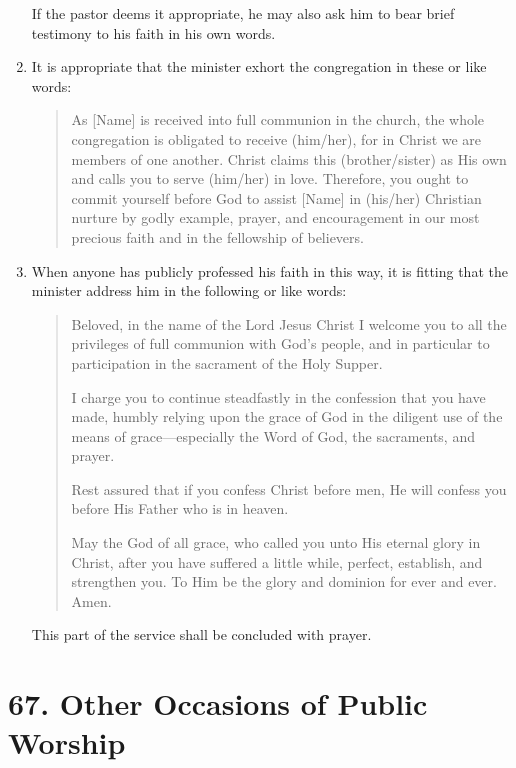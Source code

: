 \documentclass[
]{book}
\begin{document}
\begin{enumerate}
  If the pastor deems it appropriate, he may also ask him to bear brief testimony to his faith in his own words.
\item
  \protect\hypertarget{66.3}{\href{}{}}It is appropriate that the minister exhort the congregation in these or like words:

  \begin{quote}
  As {[}Name{]} is received into full communion in the church, the whole congregation is obligated to receive (him/her), for in Christ we are members of one another. Christ claims this (brother/sister) as His own and calls you to serve (him/her) in love. Therefore, you ought to commit yourself before God to assist {[}Name{]} in (his/her) Christian nurture by godly example, prayer, and encouragement in our most precious faith and in the fellowship of believers.
  \end{quote}
\item
  \protect\hypertarget{66.4}{\href{}{}}When anyone has publicly professed his faith in this way, it is fitting that the minister address him in the following or like words:

  \begin{quote}
  Beloved, in the name of the Lord Jesus Christ I welcome you to all the privileges of full communion with God's people, and in particular to participation in the sacrament of the Holy Supper.

  I charge you to continue steadfastly in the confession that you have made, humbly relying upon the grace of God in the diligent use of the means of grace---especially the Word of God, the sacraments, and prayer.

  Rest assured that if you confess Christ before men, He will confess you before His Father who is in heaven.

  May the God of all grace, who called you unto His eternal glory in Christ, after you have suffered a little while, perfect, establish, and strengthen you. To Him be the glory and dominion for ever and ever. Amen.
  \end{quote}

  This part of the service shall be concluded with prayer.
\end{enumerate}

\hypertarget{other-occasions-of-public-worship}{%
\section*{67. Other Occasions of Public Worship}\label{other-occasions-of-public-worship}}
\end{document}
